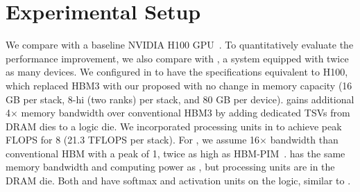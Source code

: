\section{Experimental Setup}
\label{sec:experimental_setup}

We compare \duplex with a baseline NVIDIA H100 GPU~\cite{nvidia-h100}.
To quantitatively evaluate the performance improvement, we also compare with \doublegpu, a system equipped with twice as many devices.
We configured \highp in \duplex to have the specifications equivalent to H100, which replaced HBM3 with our proposed \lowp with no change in memory capacity (16 GB per stack, 8-hi (two ranks) per stack, and 80 GB per device).
\lowp gains additional 4$\times$ memory bandwidth over conventional HBM3 by adding dedicated TSVs from DRAM dies to a logic die.
We incorporated processing units in \lowp to achieve peak FLOPS for 8 \opb (21.3 TFLOPS per \lowp stack).
For \bankpim, we assume 16$\times$ bandwidth than conventional HBM with a peak \opb of 1, twice as high as HBM-PIM~\cite{isca-2021-hbm-pim}.
\bgpim has the same memory bandwidth and computing power as \lowp, but processing units are in the DRAM die.
Both \bankpim and \bgpim have softmax and activation units on the logic, similar to \lowp.



\begin{table}[!tb]
\vspace{-0.0in}
\caption{Model Configuration Used for Evaluation}
\vspace{-0.2in}
\begin{center}
\end{center}
\vspace{-0.2in} 
\label{tab:model_configuration} 
\end{table}


